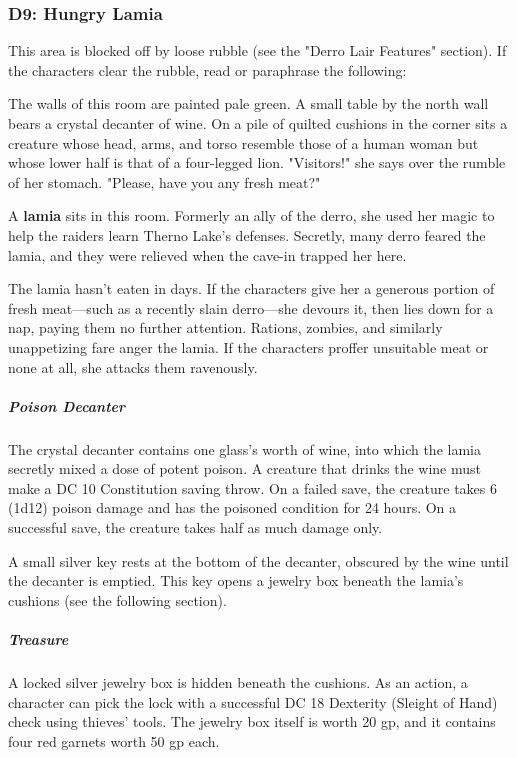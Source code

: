 \documentclass[10pt,a4paper,twoside,bg=print,twocolumn,openany,nodeprecatedcode]{dndbook}
\begin{document}
\subsubsection{D9: Hungry Lamia}
This area is blocked off by loose rubble (see the "Derro Lair Features" section). If the characters clear the rubble, read or paraphrase the following:

\begin{DndReadAloud}{}
The walls of this room are painted pale green. A small table by the north wall bears a crystal decanter of wine. On a pile of quilted cushions in the corner sits a creature whose head, arms, and torso resemble those of a human woman but whose lower half is that of a four-legged lion. "Visitors!" she says over the rumble of her stomach. "Please, have you any fresh meat?"

\end{DndReadAloud}

A \textbf{lamia} sits in this room. Formerly an ally of the derro, she used her magic to help the raiders learn Therno Lake's defenses. Secretly, many derro feared the lamia, and they were relieved when the cave-in trapped her here.

The lamia hasn't eaten in days. If the characters give her a generous portion of fresh meat—such as a recently slain derro—she devours it, then lies down for a nap, paying them no further attention. Rations, zombies, and similarly unappetizing fare anger the lamia. If the characters proffer unsuitable meat or none at all, she attacks them ravenously.

\subparagraph{Poison Decanter}
The crystal decanter contains one glass's worth of wine, into which the lamia secretly mixed a dose of potent poison. A creature that drinks the wine must make a DC 10 Constitution saving throw. On a failed save, the creature takes 6 (1d12) poison damage and has the poisoned condition for 24 hours. On a successful save, the creature takes half as much damage only.

A small silver key rests at the bottom of the decanter, obscured by the wine until the decanter is emptied. This key opens a jewelry box beneath the lamia's cushions (see the following section).

\subparagraph{Treasure}
A locked silver jewelry box is hidden beneath the cushions. As an action, a character can pick the lock with a successful DC 18 Dexterity (Sleight of Hand) check using thieves' tools. The jewelry box itself is worth 20 gp, and it contains four red garnets worth 50 gp each.
\end{document}
